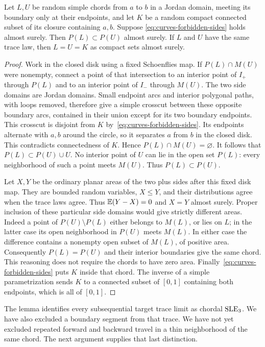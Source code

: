 \begin{lemma}
\label{lem:ordered-chords}
Let $L,U$ be random simple chords from $a$ to $b$ in a Jordan domain,
meeting its boundary only at their endpoints, and let $K$ be a random
compact connected subset of its closure containing $a,b$.  Suppose
\eqref{eq:curves-forbidden-sides} holds almost surely.  Then
$P(L)\subset P(U)$ almost surely.  If $L$ and $U$ have the same trace
law, then $L=U=K$ as compact sets almost surely.
\end{lemma}

\begin{proof}
Work in the closed disk using a fixed Schoenflies map.  If
$P(L)\cap M(U)$ were nonempty, connect a point of that intersection to
an interior point of $I_+$ through $P(L)$ and to an interior point of
$I_-$ through $M(U)$.  The two side domains are Jordan domains.  Small
endpoint arcs and interior polygonal paths, with loops removed, therefore
give a simple crosscut between these opposite boundary arcs, contained
in their union except for its two boundary endpoints.  This crosscut is
disjoint from $K$ by~\eqref{eq:curves-forbidden-sides}.  Its endpoints
alternate with $a,b$ around the circle, so it separates $a$ from $b$ in
the closed disk.  This contradicts connectedness of $K$.  Hence
$P(L)\cap M(U)=\varnothing$.  It follows that
$P(L)\subset P(U)\cup U$.  No interior point of $U$ can lie in the open
set $P(L)$: every neighborhood of such a point meets $M(U)$.  Thus
$P(L)\subset P(U)$.

Let $X,Y$ be the ordinary planar areas of the two plus sides after this
fixed disk map.  They are bounded random variables, $X\leq Y$, and their
distributions agree when the trace laws agree.  Thus $\mathbb E(Y-X)=0$ and
$X=Y$ almost surely.  Proper inclusion of these particular side domains
would give strictly different areas.  Indeed a point of
$P(U)\setminus P(L)$ either belongs to $M(L)$, or lies on $L$; in the
latter case its open neighborhood in $P(U)$ meets $M(L)$.  In either
case the difference contains a nonempty open subset of $M(L)$, of
positive area.  Consequently $P(L)=P(U)$ and their interior boundaries
give the same chord.  This reasoning does not require the chords to
have zero area.  Finally~\eqref{eq:curves-forbidden-sides} puts $K$
inside that chord.  The inverse of a simple parametrization sends $K$
to a connected subset of $[0,1]$ containing both endpoints, which is all
of $[0,1]$.
\end{proof}

The lemma identifies every subsequential target trace limit as chordal
$\operatorname{SLE}_3$.  We have also excluded a boundary segment from that trace.
We have not yet excluded repeated forward and backward travel in a
thin neighborhood of the same chord.  The next argument supplies that
last distinction.

